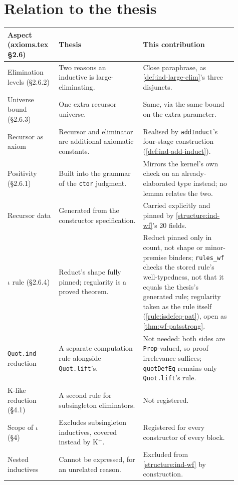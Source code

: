 \section{Relation to the thesis}
\par\smallskip\noindent
\begin{tabular}{p{0.19\linewidth}p{0.34\linewidth}p{0.38\linewidth}}
\toprule
Aspect (axioms.tex \S2.6) & Thesis & This contribution \\
\midrule
Elimination levels (\S2.6.2) & Two reasons an inductive is large-eliminating. & Close
paraphrase, as \ref{def:ind-large-elim}'s three disjuncts. \\
Universe bound (\S2.6.3) & One extra recursor universe. & Same, via the same bound on the
extra parameter. \\
Recursor as axiom & Recursor and eliminator are additional axiomatic constants. & Realised
by \texttt{addInduct}'s four-stage construction (\ref{def:ind-add-induct}). \\
Positivity (\S2.6.1) & Built into the grammar of the \texttt{ctor} judgment. & Mirrors the
kernel's own check on an already-elaborated type instead; no lemma relates the two. \\
Recursor data & Generated from the constructor specification. & Carried explicitly and
pinned by \ref{structure:ind-wf}'s 20 fields. \\
$\iota$ rule (\S2.6.4) & Reduct's shape fully pinned; regularity is a proved theorem. &
Reduct pinned only in count, not shape or minor-premise binders; \texttt{rules\_wf} checks
the stored rule's well-typedness, not that it equals the thesis's generated rule; regularity
taken as the rule itself (\ref{rule:isdefeq-pat}), open as \ref{thm:wf-patsstrong}. \\
\texttt{Quot.ind} reduction & A separate computation rule alongside \texttt{Quot.lift}'s. &
Not needed: both sides are \texttt{Prop}-valued, so proof irrelevance suffices;
\texttt{quotDefEq} remains only \texttt{Quot.lift}'s rule. \\
K-like reduction (\S4.1) & A second rule for subsingleton eliminators. & Not registered. \\
Scope of $\iota$ (\S4) & Excludes subsingleton inductives, covered instead by K$^+$. &
Registered for every constructor of every block. \\
Nested inductives & Cannot be expressed, for an unrelated reason. & Excluded from
\ref{structure:ind-wf} by construction. \\
\bottomrule
\end{tabular}\par\smallskip

